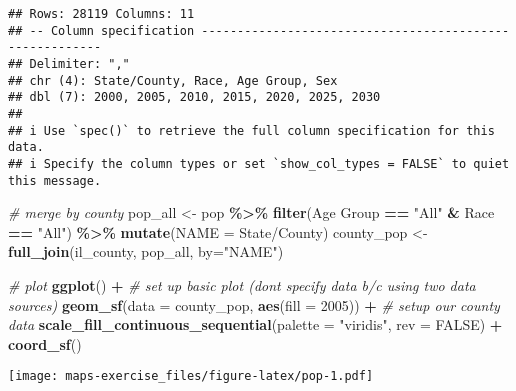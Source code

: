 \documentclass[
]{article}
\newenvironment{Shaded}{\begin{snugshade}}{\end{snugshade}}
\newcommand{\AttributeTok}[1]{\textcolor[rgb]{0.13,0.29,0.53}{#1}}
\newcommand{\CommentTok}[1]{\textcolor[rgb]{0.56,0.35,0.01}{\textit{#1}}}
\newcommand{\ConstantTok}[1]{\textcolor[rgb]{0.56,0.35,0.01}{#1}}
\newcommand{\FunctionTok}[1]{\textcolor[rgb]{0.13,0.29,0.53}{\textbf{#1}}}
\newcommand{\NormalTok}[1]{#1}
\newcommand{\OtherTok}[1]{\textcolor[rgb]{0.56,0.35,0.01}{#1}}
\newcommand{\SpecialCharTok}[1]{\textcolor[rgb]{0.81,0.36,0.00}{\textbf{#1}}}
\newcommand{\StringTok}[1]{\textcolor[rgb]{0.31,0.60,0.02}{#1}}
\begin{document}
\begin{verbatim}
## Rows: 28119 Columns: 11
## -- Column specification --------------------------------------------------------
## Delimiter: ","
## chr (4): State/County, Race, Age Group, Sex
## dbl (7): 2000, 2005, 2010, 2015, 2020, 2025, 2030
## 
## i Use `spec()` to retrieve the full column specification for this data.
## i Specify the column types or set `show_col_types = FALSE` to quiet this message.
\end{verbatim}

\begin{Shaded}
\begin{Highlighting}[]
\CommentTok{\# merge by county}
\NormalTok{pop\_all }\OtherTok{\textless{}{-}}\NormalTok{ pop }\SpecialCharTok{\%\textgreater{}\%} \FunctionTok{filter}\NormalTok{(}\StringTok{\textasciigrave{}}\AttributeTok{Age Group}\StringTok{\textasciigrave{}} \SpecialCharTok{==} \StringTok{"All"} \SpecialCharTok{\&}\NormalTok{ Race }\SpecialCharTok{==} \StringTok{"All"}\NormalTok{) }\SpecialCharTok{\%\textgreater{}\%} \FunctionTok{mutate}\NormalTok{(}\AttributeTok{NAME =} \StringTok{\textasciigrave{}}\AttributeTok{State/County}\StringTok{\textasciigrave{}}\NormalTok{)}
\NormalTok{county\_pop }\OtherTok{\textless{}{-}} \FunctionTok{full\_join}\NormalTok{(il\_county, pop\_all, }\AttributeTok{by=}\StringTok{"NAME"}\NormalTok{)}
  
\CommentTok{\# plot}
\FunctionTok{ggplot}\NormalTok{() }\SpecialCharTok{+} \CommentTok{\# set up basic plot (don\textquotesingle{}t specify data b/c using two data sources)}
 \FunctionTok{geom\_sf}\NormalTok{(}\AttributeTok{data =}\NormalTok{ county\_pop, }\FunctionTok{aes}\NormalTok{(}\AttributeTok{fill =} \StringTok{\textasciigrave{}}\AttributeTok{2005}\StringTok{\textasciigrave{}}\NormalTok{)) }\SpecialCharTok{+} \CommentTok{\# setup our county data}
 \FunctionTok{scale\_fill\_continuous\_sequential}\NormalTok{(}\AttributeTok{palette =} \StringTok{"viridis"}\NormalTok{, }\AttributeTok{rev =} \ConstantTok{FALSE}\NormalTok{) }\SpecialCharTok{+}
  \FunctionTok{coord\_sf}\NormalTok{() }
\end{Highlighting}
\end{Shaded}

\texttt{[image: maps-exercise\_files/figure-latex/pop-1.pdf]}
\end{document}
